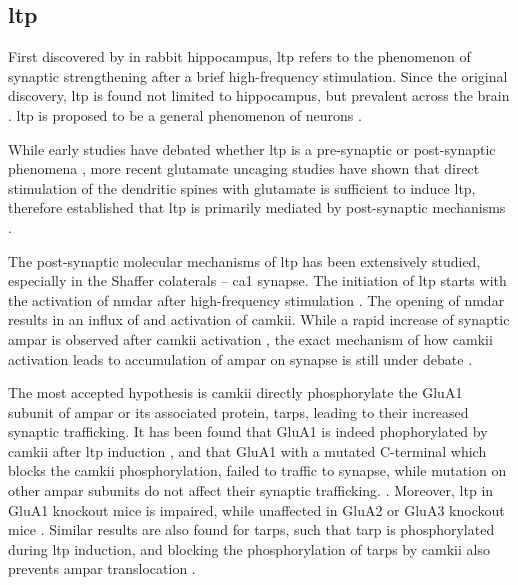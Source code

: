 \subsection{\gls{ltp}}

First discovered by \citet{bliss73} in rabbit hippocampus, \gls{ltp} refers to the phenomenon of synaptic strengthening after a brief high-frequency stimulation. Since the original discovery, \gls{ltp} is found not limited to hippocampus, but prevalent across the brain \citep[e.g.][]{clugnet90}. \gls{ltp} is proposed to be a general phenomenon of neurons \citep{malenka04}. 

While early studies have debated whether \gls{ltp} is a pre-synaptic or post-synaptic phenomena \citep{malinow90, bekkers90, isaac95, liao95}, more recent glutamate uncaging studies have shown that direct stimulation of the dendritic spines with glutamate is sufficient to induce \gls{ltp}, therefore established that \gls{ltp} is primarily mediated by post-synaptic mechanisms \citep{kerchner08}. 

The post-synaptic molecular mechanisms of \gls{ltp} has been extensively studied, especially in the Shaffer colaterals -- \gls{ca1} synapse. The initiation of \gls{ltp} starts with the activation of \gls{nmdar} after high-frequency stimulation \citep{collingridge83}. The opening of \gls{nmdar} results in an influx of  and activation of \gls{camkii}. While a rapid increase of synaptic \gls{ampar} is observed after \gls{camkii} activation \citep{patterson10}, the exact mechanism of how \gls{camkii} activation leads to accumulation of \gls{ampar} on synapse is still under debate \citep{herring16}. 

The most accepted hypothesis is \gls{camkii} directly phosphorylate the GluA1 subunit of \gls{ampar} or its associated protein, \glspl{tarp}, leading to their increased synaptic trafficking. It has been found that GluA1 is indeed phophorylated by \gls{camkii} after \gls{ltp} induction \citep{mcglade-mcculloh93, barria97, lee03}, and that GluA1 with a mutated C-terminal which blocks the \gls{camkii} phosphorylation, failed to traffic to synapse, while mutation on other \gls{ampar} subunits do not affect their synaptic trafficking. \citep{hayashi00, shi01}. Moreover, \gls{ltp} in GluA1 knockout mice is impaired, while unaffected in GluA2 or GluA3 knockout mice \citep{zamanillo99, meng03}. Similar results are also found for \glspl{tarp}, such that \gls{tarp} is phosphorylated during \gls{ltp} induction, and blocking the phosphorylation of \glspl{tarp} by \gls{camkii} also prevents \gls{ampar} translocation \citep{tomita05, sumioka10}.

